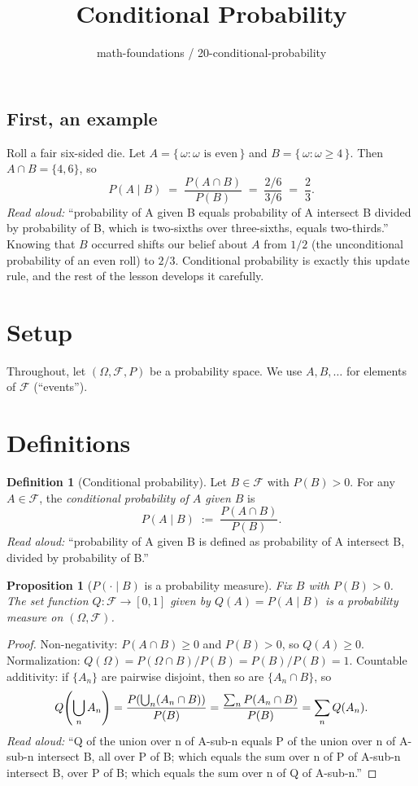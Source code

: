 \documentclass[11pt]{article}
\title{Conditional Probability}
\author{math-foundations / 20-conditional-probability}
\date{}
\newtheorem{proposition}[theorem]{Proposition}
\theoremstyle{definition}
\newtheorem{definition}[theorem]{Definition}
\begin{document}
\maketitle

\subsection*{First, an example}
Roll a fair six-sided die. Let $A = \{\,\omega : \omega \text{ is even}\,\}$ and
$B = \{\,\omega : \omega \ge 4\,\}$. Then $A \cap B = \{4, 6\}$, so
\[
P(A \mid B) \;=\; \frac{P(A \cap B)}{P(B)} \;=\; \frac{2/6}{3/6} \;=\; \frac{2}{3}.
\]
\emph{Read aloud:} ``probability of A given B equals probability of A intersect B divided by probability of B, which is two-sixths over three-sixths, equals two-thirds.''
Knowing that $B$ occurred shifts our belief about $A$ from $1/2$ (the unconditional
probability of an even roll) to $2/3$. Conditional probability is exactly this
update rule, and the rest of the lesson develops it carefully.

\section{Setup}
Throughout, let $(\Omega, \mathcal{F}, P)$ be a probability space. We use
$A, B, \ldots$ for elements of $\mathcal{F}$ (``events'').

\section{Definitions}

\begin{definition}[Conditional probability]
Let $B \in \mathcal{F}$ with $P(B) > 0$. For any $A \in \mathcal{F}$, the
\emph{conditional probability of $A$ given $B$} is
\[
P(A \mid B) \;:=\; \frac{P(A \cap B)}{P(B)}.
\]
\emph{Read aloud:} ``probability of A given B is defined as probability of A intersect B, divided by probability of B.''
\end{definition}

\begin{proposition}[$P(\cdot \mid B)$ is a probability measure]
Fix $B$ with $P(B) > 0$. The set function $Q : \mathcal{F} \to [0,1]$ given
by $Q(A) = P(A \mid B)$ is a probability measure on $(\Omega, \mathcal{F})$.
\end{proposition}

\begin{proof}
Non-negativity: $P(A \cap B) \ge 0$ and $P(B) > 0$, so $Q(A) \ge 0$.
Normalization: $Q(\Omega) = P(\Omega \cap B)/P(B) = P(B)/P(B) = 1$.
Countable additivity: if $\{A_n\}$ are pairwise disjoint, then so are
$\{A_n \cap B\}$, so
\[
Q\!\left(\bigcup_n A_n\right) = \frac{P\!\left(\bigcup_n (A_n \cap B)\right)}{P(B)}
= \frac{\sum_n P(A_n \cap B)}{P(B)} = \sum_n Q(A_n). \qedhere
\]
\emph{Read aloud:} ``Q of the union over n of A-sub-n equals P of the union over n of A-sub-n intersect B, all over P of B; which equals the sum over n of P of A-sub-n intersect B, over P of B; which equals the sum over n of Q of A-sub-n.''
\end{proof}
\end{document}
